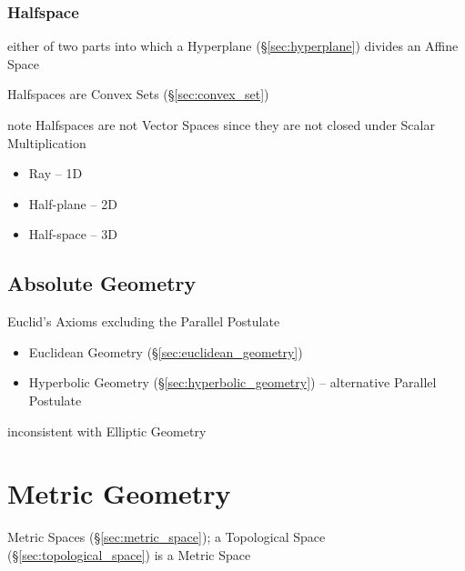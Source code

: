 \subsubsection{Halfspace}\label{sec:halfspace}

either of two parts into which a Hyperplane (\S\ref{sec:hyperplane}) divides an
Affine Space

Halfspaces are Convex Sets (\S\ref{sec:convex_set})

note Halfspaces are not Vector Spaces since they are not closed under Scalar
Multiplication

\begin{itemize}
  \item Ray -- 1D
  \item Half-plane -- 2D
  \item Half-space -- 3D
\end{itemize}



\subsection{Absolute Geometry}\label{sec:absolute_geometry}

Euclid's Axioms excluding the Parallel Postulate

\begin{itemize}
  \item Euclidean Geometry (\S\ref{sec:euclidean_geometry})
  \item Hyperbolic Geometry (\S\ref{sec:hyperbolic_geometry}) -- alternative
    Parallel Postulate
\end{itemize}

inconsistent with Elliptic Geometry



\section{Metric Geometry}\label{sec:metric_geometry}

Metric Spaces (\S\ref{sec:metric_space}); a Topological Space
(\S\ref{sec:topological_space}) is a Metric Space



